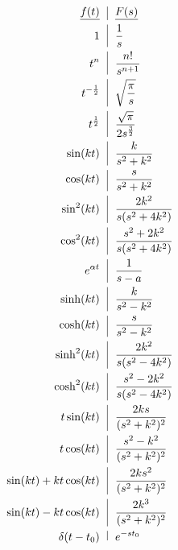 \documentclass[12pt]{article}
\begin{document}
\begin{multicols}{2}

\begin{equation*}
  \begin{split}
    \underline{f(t)}\,\,\,\,&\vline\,\,\,\,\underline{F(s)}\\
      1\,\,\,\,&\vline\,\,\,\,\frac{1}{s}\\
      t^n\,\,\,\,&\vline\,\,\,\,\frac{n!}{s^{n+1}}\\
      t^{-\frac{1}{2}}\,\,\,\,&\vline\,\,\,\,\sqrt{\frac{\pi}{s}}\\
      t^{\frac{1}{2}}\,\,\,\,&\vline\,\,\,\,\frac{\sqrt{\pi}}{2s^{\frac{3}{2}}}\\
      \sin (kt)\,\,\,\,&\vline\,\,\,\,\frac{k}{s^2+k^2}\\
      \cos (kt)\,\,\,\,&\vline\,\,\,\,\frac{s}{s^2+k^2}\\
      \sin^2(kt)\,\,\,\,&\vline\,\,\,\,\frac{2k^2}{s(s^2+4k^2)}\\
      \cos^2(kt)\,\,\,\,&\vline\,\,\,\,\frac{s^2+2k^2}{s(s^2+4k^2)}\\
      e^{\alpha t}\,\,\,\,&\vline\,\,\,\,\frac{1}{s-a}\\
    \sinh (kt)\,\,\,\,&\vline\,\,\,\,\frac{k}{s^2-k^2}\\
    \cosh (kt)\,\,\,\,&\vline\,\,\,\,\frac{s}{s^2-k^2}\\
      \sinh^2 (kt)\,\,\,\,&\vline\,\,\,\,\frac{2k^2}{s(s^2-4k^2)}\\
      \cosh^2 (kt)\,\,\,\,&\vline\,\,\,\,\frac{s^2-2k^2}{s(s^2-4k^2)}\\
    t\sin(kt)\,\,\,\,&\vline\,\,\,\,\frac{2ks}{(s^2+k^2)^2}\\
    t\cos(kt)\,\,\,\,&\vline\,\,\,\,\frac{s^2-k^2}{(s^2+k^2)^2}\\
    \sin(kt)+kt\cos(kt)\,\,\,\,&\vline\,\,\,\,\frac{2ks^2}{(s^2+k^2)^2}\\
    \sin(kt)-kt\cos(kt)\,\,\,\,&\vline\,\,\,\,\frac{2k^3}{(s^2+k^2)^2}\\
    \delta(t-t_0)\,\,\,\,&\vline\,\,\,\,e^{-st_0}
  \end{split}
  \label{3}
  \end{equation*}
    

\end{multicols}
\end{document}
